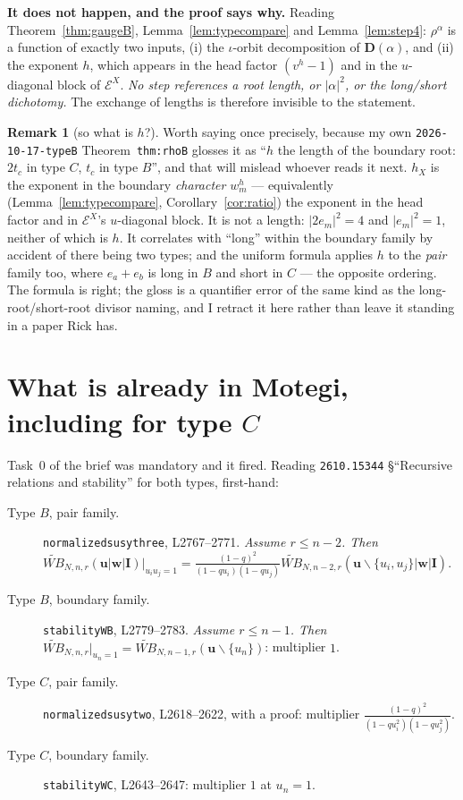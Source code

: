 \documentclass[11pt]{article}
\theoremstyle{definition}
\newtheorem{rem}[thm]{Remark}
\newcommand{\bI}{\mathbf{I}}
\newcommand{\bD}{\mathbf{D}}
\newcommand{\sm}{\smallsetminus}
\newcommand{\EX}{\mathcal{E}^{X}}
\begin{document}
\textbf{It does not happen, and the proof says why.}  Reading
Theorem~\ref{thm:gaugeB}, Lemma~\ref{lem:typecompare} and
Lemma~\ref{lem:step4}: $\rho^{\alpha}$ is a function of exactly two inputs, (i)
the $\iota$-orbit decomposition of $\bD(\alpha)$, and (ii) the exponent $h$,
which appears in the head factor $(v^{h}-1)$ and in the $u$-diagonal block of
$\EX$.  \emph{No step references a root length, or $|\alpha|^{2}$, or the
long/short dichotomy.}  The exchange of lengths is therefore invisible to the
statement.

\begin{rem}[so what is $h$?]\label{rem:h}
Worth saying once precisely, because my own \texttt{2026-10-17-typeB}
Theorem~\texttt{thm:rhoB} glosses it as ``$h$ the length of the boundary root:
$2t_c$ in type $C$, $t_c$ in type $B$'', and that will mislead whoever reads it
next.  $h_X$ is the exponent in the boundary \emph{character} $w_m^{h}$ ---
equivalently (Lemma~\ref{lem:typecompare}, Corollary~\ref{cor:ratio}) the
exponent in the head factor and in $\EX$'s $u$-diagonal block.  It is not a
length: $|2e_m|^{2}=4$ and $|e_m|^{2}=1$, neither of which is $h$.  It
correlates with ``long'' within the boundary family by accident of there being
two types; and the uniform formula applies $h$ to the \emph{pair} family too,
where $e_a+e_b$ is long in $B$ and short in $C$ --- the opposite ordering.  The
formula is right; the gloss is a quantifier error of the same kind as the
long-root/short-root divisor naming, and I retract it here rather than leave it
standing in a paper Rick has.
\end{rem}

\section{What is already in Motegi, including for type $C$}
\label{sec:priority}

Task~0 of the brief was mandatory and it fired.  Reading \texttt{2610.15344}
\S``Recursive relations and stability'' for both types, first-hand:

\begin{description}
\item[Type $B$, pair family.]  \texttt{normalizedsusythree}, L2767--2771.
  \emph{Assume $r\le n-2$.  Then}
  $\widetilde{WB}_{N,n,r}(\mathbf u|\mathbf w|\bI)\big|_{u_iu_j=1}
   =\frac{(1-q)^{2}}{(1-qu_i)(1-qu_j)}
    \widetilde{WB}_{N,n-2,r}(\mathbf u\sm\{u_i,u_j\}|\mathbf w|\bI)$.
\item[Type $B$, boundary family.]  \texttt{stabilityWB}, L2779--2783.
  \emph{Assume $r\le n-1$.  Then}
  $\widetilde{WB}_{N,n,r}\big|_{u_n=1}
   =\widetilde{WB}_{N,n-1,r}(\mathbf u\sm\{u_n\})$: multiplier $1$.
\item[Type $C$, pair family.]  \texttt{normalizedsusytwo}, L2618--2622, with a
  proof: multiplier $\frac{(1-q)^{2}}{(1-qu_i^{2})(1-qu_j^{2})}$.
\item[Type $C$, boundary family.]  \texttt{stabilityWC}, L2643--2647:
  multiplier $1$ at $u_n=1$.
\end{description}
\end{document}
